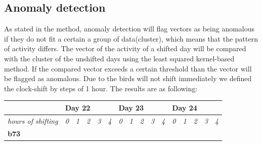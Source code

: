 \documentclass[a4paper]{article}
\begin{document}
\subsection*{Anomaly detection}
As stated in the method, anomaly detection will flag vectors as being anomalous if they do not fit a certain a group of data(cluster), which means that the pattern of activity differs. The vector of the activity of a shifted day will be compared with the cluster of the unshifted days using the least squared kernel-based method. If the compared vector exceeds a certain threshold than the vector will be flagged as anomalous. Due to the birds will not shift immediately we defined the clock-shift by steps of 1 hour. The results are as following:\\
\begin{table}[H]
\centering
\begin{tabular}{llllllllllllllll}
\hline
\multicolumn{1}{|l|}{} & \multicolumn{5}{l|}{\textbf{Day 22}} & \multicolumn{5}{l|}{\textbf{Day 23}} & \multicolumn{5}{l|}{\textbf{Day 24}} \\ \hline
\multicolumn{1}{|l|}{\textit{hours of shifting}} & \multicolumn{1}{l|}{\textit{0}} & \multicolumn{1}{l|}{\textit{1}} & \multicolumn{1}{l|}{\textit{2}} & \multicolumn{1}{l|}{\textit{3}} & \multicolumn{1}{l|}{\textit{4}} & \multicolumn{1}{l|}{\textit{0}} & \multicolumn{1}{l|}{\textit{1}} & \multicolumn{1}{l|}{\textit{2}} & \multicolumn{1}{l|}{\textit{3}} & \multicolumn{1}{l|}{\textit{4}} & \multicolumn{1}{l|}{\textit{0}} & \multicolumn{1}{l|}{\textit{1}} & \multicolumn{1}{l|}{\textit{2}} & \multicolumn{1}{l|}{\textit{3}} & \multicolumn{1}{l|}{\textit{4}} \\ \hline
\multicolumn{1}{|l|}{\textbf{b73}} & \multicolumn{1}{l|}{\cellcolor[HTML]{67FD9A}} & \multicolumn{1}{l|}{\cellcolor[HTML]{67FD9A}} & \multicolumn{1}{l|}{\cellcolor[HTML]{67FD9A}} & \multicolumn{1}{l|}{\cellcolor[HTML]{67FD9A}} & \multicolumn{1}{l|}{\cellcolor[HTML]{67FD9A}} & \multicolumn{1}{l|}{\cellcolor[HTML]{67FD9A}} & \multicolumn{1}{l|}{\cellcolor[HTML]{67FD9A}} & \multicolumn{1}{l|}{\cellcolor[HTML]{67FD9A}} & \multicolumn{1}{l|}{\cellcolor[HTML]{67FD9A}} & \multicolumn{1}{l|}{\cellcolor[HTML]{67FD9A}} & \multicolumn{1}{l|}{\cellcolor[HTML]{FD6864}} & \multicolumn{1}{l|}{\cellcolor[HTML]{67FD9A}} & \multicolumn{1}{l|}{\cellcolor[HTML]{FD6864}} & \multicolumn{1}{l|}{\cellcolor[HTML]{FD6864}} & \multicolumn{1}{l|}{\cellcolor[HTML]{FD6864}} \\ \hline

\end{tabular}
\end{table}
\end{document}

